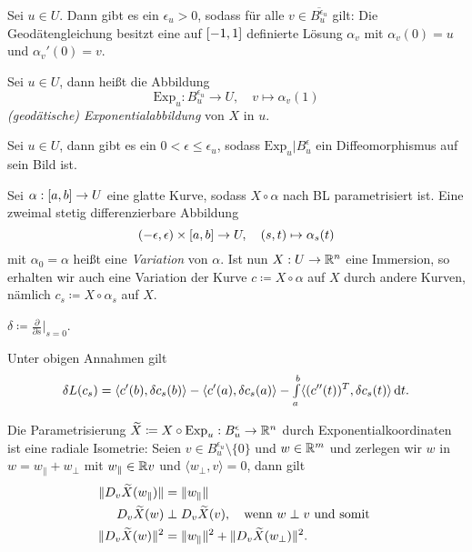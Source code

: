 \documentclass{cheat-sheet}
\newcommand{\Exp}{\mathrm{Exp}} %
\begin{document}
\begin{satz}
  Sei $u \in U$. Dann gibt es ein $\epsilon_u > 0$, sodass für alle $v \in \overline{B_u^{\epsilon_u}}$ gilt: Die Geodätengleichung besitzt eine auf $\left[ -1, 1 \right]$ definierte Lösung $\alpha_v$ mit $\alpha_v(0) = u$ und $\alpha_v'(0) = v$.
\end{satz}

\begin{defn}
  Sei $u \in U$, dann heißt die Abbildung
  \[ \Exp_u : B_u^{\epsilon_u} \to U, \quad v \mapsto \alpha_v(1) \]
  \emph{(geodätische) Exponentialabbildung} von $X$ in $u$.
\end{defn}

\begin{defn}
  Sei $u \in U$, dann gibt es ein $0 < \epsilon \leq \epsilon_u$, sodass $\Exp_u|B_u^\epsilon$ ein Diffeomorphismus auf sein Bild ist.
\end{defn}


\begin{defn}
  Sei $\alpha : \left[ a, b \right] \to U$ eine glatte Kurve, sodass $X \circ \alpha$ nach BL parametrisiert ist. Eine zweimal stetig differenzierbare Abbildung
  \[ \left( -\epsilon, \epsilon \right) \times \left[ a, b \right] \to U, \quad (s, t) \mapsto \alpha_s(t) \]
  mit $\alpha_0 = \alpha$ heißt eine \emph{Variation} von $\alpha$. Ist nun $X : U \to \mathbb{R}^n$ eine Immersion, so erhalten wir auch eine Variation der Kurve $c \coloneqq X \circ \alpha$ auf $X$ durch andere Kurven, nämlich $c_s \coloneqq X \circ \alpha_s$ auf $X$.
\end{defn}

\begin{nota}
  $\delta \coloneqq \tfrac{\partial}{\partial s}|_{s=0}$.
\end{nota}

\begin{satz}
  Unter obigen Annahmen gilt
  \[ \delta L(c_s) = \langle c'(b), \delta c_s(b) \rangle - \langle c'(a), \delta c_s(a) \rangle - {\textstyle \int\limits_{a}^{b}} \langle (c''(t))^T, \delta c_s(t) \rangle \,\mathrm{d} t. \]
\end{satz}

\begin{satz}[Gaußlemma]
  Die Parametrisierung $\widetilde{X} \coloneqq X \circ \Exp_u : B_u^\epsilon \to \R^n$ durch Exponentialkoordinaten ist eine radiale Isometrie: Seien $v \in B_u^{\epsilon_u} \setminus \{0\}$ und $w \in \mathbb{R}^m$ und zerlegen wir $w$ in $w = w_{\|} + w_\perp$ mit $w_{\|} \in \mathbb{R} v$ und $\langle w_\perp, v \rangle = 0$, dann gilt
  \begin{align*}
    \lVert D_v \widetilde{X}(w_{\|})\rVert &= \lVert w_{\|}\rVert\\
    D_v \widetilde{X}(w) &\perp D_v \widetilde{X}(v), \quad \text{wenn $w \perp v$  und somit }\\
    \lVert D_v \widetilde{X}(w)\rVert^2 &= \lVert w_{\|}\rVert^2 + \lVert D_v \widetilde{X}(w_{\perp})\rVert^2.
  \end{align*}
\end{satz}
\end{document}
